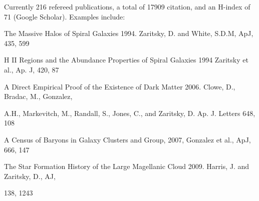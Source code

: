 \noindent
{} Currently 216 refereed publications, a total of 17909 citation, and an H-index of 71 (Google Scholar). Examples include:

\vskip -5pt
\noindent
The Massive Halos of Spiral Galaxies 1994. Zaritsky, D. and White, S.D.M, ApJ, 435, 599\hfil 

\vskip -8pt
\noindent
H II Regions and the Abundance Properties of Spiral Galaxies
1994 Zaritsky et al.,  Ap. J, 420, 87

\vskip -8pt
\noindent
A Direct Empirical Proof of the Existence of Dark Matter 2006. Clowe, D., Bradac, M., Gonzalez,\hfil

\vskip -8pt
\hskip 1cm A.H., Markevitch, M., Randall, S., Jones, C., and Zaritsky, D. Ap. J. Letters 648, 108

\vskip -8pt
\noindent
A Census of Baryons in Galaxy Clusters and Group, 2007, Gonzalez et al., ApJ, 666, 147

\vskip -8pt
\noindent
The Star Formation History of the Large Magellanic Cloud 2009. Harris, J. and Zaritsky, D., AJ,\hfil

\vskip -8pt
\hskip 1cm
138, 1243


